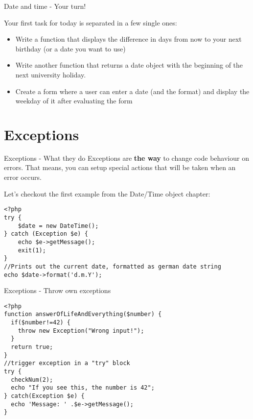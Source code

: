 \begin{frame}[fragile]{Date and time - Your turn!}

Your first task for today is separated in a few single ones:

\begin{itemize}
\item Write a function that displays the difference in days from now to your next birthday (or a date you want to use) \pause
\item Write another function that returns a date object with the beginning of the next university holiday. \pause
\item Create a form where a user can enter a date (and the format) and display the weekday of it after evaluating the form
\end{itemize}

\end{frame}

\section{Exceptions}

\begin{frame}[fragile]{Exceptions - What they do}
Exceptions are \textbf{the way} to change code behaviour on errors. That means, you can setup special actions that will be taken when an error occurs. \pause

Let's checkout the first example from the Date/Time object chapter:

\begin{lstlisting}
<?php
try {
    $date = new DateTime();
} catch (Exception $e) {
    echo $e->getMessage();
    exit(1);
}
//Prints out the current date, formatted as german date string
echo $date->format('d.m.Y');
\end{lstlisting}

\end{frame}

\begin{frame}[fragile]{Exceptions - Throw own exceptions}

\begin{lstlisting}
<?php
function answerOfLifeAndEverything($number) {
  if($number!=42) {
    throw new Exception("Wrong input!");
  }
  return true;
}
//trigger exception in a "try" block
try {
  checkNum(2);
  echo "If you see this, the number is 42";
} catch(Exception $e) {
  echo 'Message: ' .$e->getMessage();
}
\end{lstlisting}

\end{frame}


